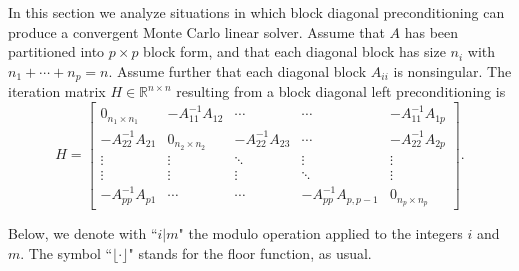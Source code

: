 \documentclass[times]{nlaauth}
\begin{document}
In this section we analyze situations in which block diagonal preconditioning
can produce a convergent Monte Carlo linear solver.
Assume that $A$ has been partitioned into $p\times p$ block form, and that
each diagonal block has size $n_i$ with $n_1 +\cdots +n_p=n$. Assume further
that each diagonal block $A_{ii}$ is nonsingular.
The iteration
matrix $H\in\mathbb{R}^{n\times n}$ resulting from a block diagonal left
preconditioning is
\[
 H=\begin{bmatrix}0_{n_1\times n_1} & -A_{11}^{-1}A_{12} & \cdots &
\cdots & -A_{11}^{-1}A_{1p} \\
-A_{22}^{-1}A_{21} & 0_{n_2\times n_2} & -A_{22}^{-1}A_{23} &
\cdots & -A_{22}^{-1}A_{2p}\\
\vdots & \vdots & \ddots & \vdots & \vdots\\
\vdots & \vdots & \vdots &\ddots & \vdots \\
-A_{pp}^{-1}A_{p1} &  \cdots & \cdots&
-A_{pp}^{-1}A_{p,p-1} & 0_{n_p \times n_p}
\end{bmatrix}.
\]

Below, we denote with ``$i|m$" the
modulo operation applied to the integers $i$ and $m$. The
symbol ``$\lfloor \cdot \rfloor$" stands for the floor function, as usual.
\end{document}
